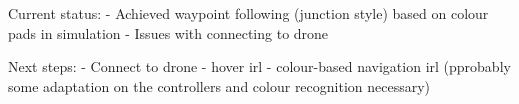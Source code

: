 Current status:
 - Achieved waypoint following (junction style) based on colour pads in simulation
 - Issues with connecting to drone 
 
Next steps:
 - Connect to drone
 - hover irl
 - colour-based navigation irl (pprobably some adaptation on the controllers and colour recognition necessary)